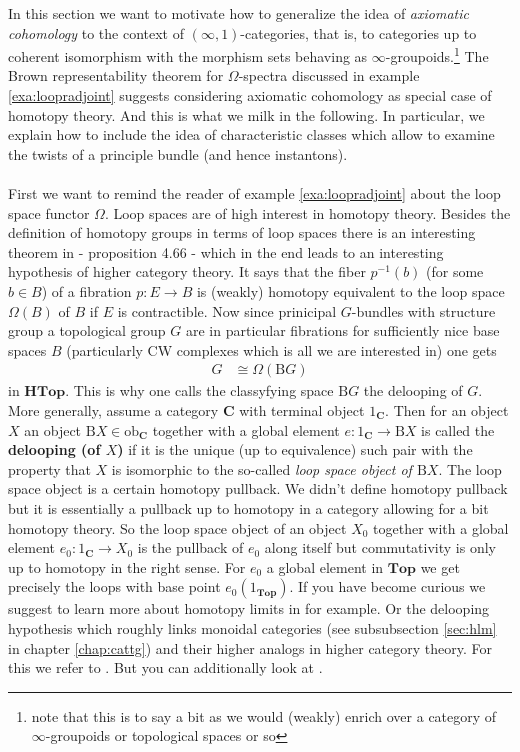 In this section we want to motivate how to generalize the idea of \textit{axiomatic cohomology} to the context of $(\infty,1)$-categories, that is, to categories up to coherent isomorphism with the {\glqq}morphism sets{\grqq} behaving as $\infty$-groupoids.\footnote{note that this is to say a bit as we would (weakly) enrich over a category of $\infty$-groupoids or topological spaces or so} The Brown representability theorem for $\Omega$-spectra discussed in example \ref{exa:loopradjoint} suggests considering axiomatic cohomology as special case of homotopy theory. And this is what we milk in the following. In particular, we explain how to include the idea of characteristic classes which allow to examine the {\glqq}twists{\grqq} of a principle bundle (and hence instantons).
\\\\
First we want to remind the reader of example \ref{exa:loopradjoint} about the loop space functor $\Omega$. Loop spaces are of high interest in homotopy theory. Besides the definition of homotopy groups in terms of loop spaces there is an interesting theorem in \cite{8b5861fc} - proposition 4.66 - which in the end leads to an interesting hypothesis of higher category theory. It says that the fiber $p^{-1}(b)$ (for some $b \in B$) of a fibration $p \colon E \rightarrow B$ is (weakly) homotopy equivalent to the loop space $\Omega(B)$ of $B$ if $E$ is contractible. Now since prinicipal $G$-bundles with structure group a topological group $G$ are in particular fibrations for sufficiently nice base spaces $B$ (particularly CW complexes which is all we are interested in) one gets
\begin{align*}
  G
  &\cong
  \Omega(\mathrm{B}G)
\end{align*}
in $\mathbf{HTop}$. This is why one calls the classyfying space $\mathrm{B}G$ the delooping of $G$. More generally, assume a category $\mathbf{C}$ with terminal object $1_{\mathbf{C}}$. Then for an object $X$ an object $\mathrm{B}X \in \mathrm{ob}_{\mathbf{C}}$ together with a global element $e \colon 1_{\mathbf{C}} \rightarrow \mathrm{B}X$ is called the \textbf{delooping (of $X$)} if it is the unique (up to equivalence) such pair with the property that $X$ is isomorphic to the so-called \textit{loop space object of $\mathrm{B}X$}. The loop space object is a certain homotopy pullback. We didn't define homotopy pullback but it is essentially a pullback up to homotopy in a category allowing for a bit homotopy theory. So the loop space object of an object $X_{0}$ together with a global element $e_{0} \colon 1_{\mathbf{C}} \rightarrow X_{0}$ is the pullback of $e_{0}$ along itself but commutativity is only up to homotopy in the right sense. For $e_{0}$ a global element in $\mathbf{Top}$ we get precisely the loops with base point $e_{0}(1_{\mathbf{Top}})$. If you have become curious we suggest to learn more about homotopy limits in \cite{7a40623d} for example. Or the delooping hypothesis which roughly links monoidal categories (see subsubsection \ref{sec:hlm} in chapter \ref{chap:cattg}) and their higher analogs in higher category theory. For this we refer to \cite{00000011}. But you can additionally look at \cite{66edf75b}.
